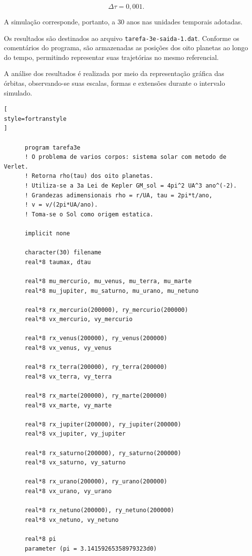 \documentclass[12pt,a4paper]{article}
\begin{document}
\begin{equation}
    \Delta\tau=0,001.
\end{equation}

A simulação corresponde, portanto, a 30 anos nas unidades temporais adotadas.

Os resultados são destinados ao arquivo \texttt{tarefa-3e-saida-1.dat}. Conforme os comentários do programa, são armazenadas as posições dos oito planetas ao longo do tempo, permitindo representar suas trajetórias no mesmo referencial.

A análise dos resultados é realizada por meio da representação gráfica das órbitas, observando-se suas escalas, formas e extensões durante o intervalo simulado.

\begin{lstlisting}[
style=fortranstyle
]

      program tarefa3e
      ! O problema de varios corpos: sistema solar com metodo de Verlet.
      ! Retorna rho(tau) dos oito planetas.
      ! Utiliza-se a 3a Lei de Kepler GM_sol = 4pi^2 UA^3 ano^(-2).
      ! Grandezas adimensionais rho = r/UA, tau = 2pi*t/ano,
      ! v = v/(2pi*UA/ano).
      ! Toma-se o Sol como origem estatica.

      implicit none

      character(30) filename
      real*8 taumax, dtau

      real*8 mu_mercurio, mu_venus, mu_terra, mu_marte
      real*8 mu_jupiter, mu_saturno, mu_urano, mu_netuno

      real*8 rx_mercurio(200000), ry_mercurio(200000)
      real*8 vx_mercurio, vy_mercurio

      real*8 rx_venus(200000), ry_venus(200000)
      real*8 vx_venus, vy_venus

      real*8 rx_terra(200000), ry_terra(200000)
      real*8 vx_terra, vy_terra

      real*8 rx_marte(200000), ry_marte(200000)
      real*8 vx_marte, vy_marte

      real*8 rx_jupiter(200000), ry_jupiter(200000)
      real*8 vx_jupiter, vy_jupiter

      real*8 rx_saturno(200000), ry_saturno(200000)
      real*8 vx_saturno, vy_saturno

      real*8 rx_urano(200000), ry_urano(200000)
      real*8 vx_urano, vy_urano

      real*8 rx_netuno(200000), ry_netuno(200000)
      real*8 vx_netuno, vy_netuno

      real*8 pi
      parameter (pi = 3.14159265358979323d0)


\end{lstlisting}
\end{document}
